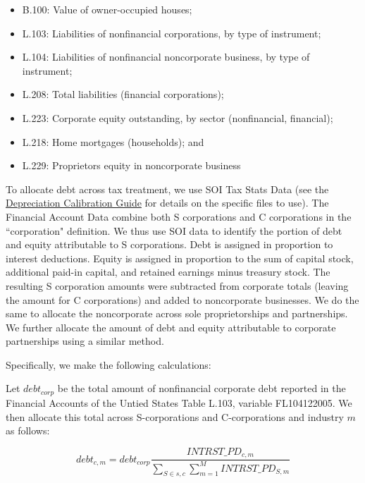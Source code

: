 \documentclass[article,11pt,letterpaper,fleqn]{article}
\theoremstyle{definition}
\numberwithin{equation}{section}
\begin{document}
\begin{itemize}
\item B.100: Value of owner-occupied houses;
\item L.103: Liabilities of nonfinancial corporations, by type of instrument;
\item L.104: Liabilities of nonfinancial noncorporate business, by type of instrument;
\item L.208: Total liabilities (financial corporations);
\item L.223: Corporate equity outstanding, by sector (nonfinancial, financial);
\item L.218: Home mortgages (households); and
\item L.229: Proprietors equity in noncorporate business
\end{itemize}

To allocate debt across tax treatment, we use SOI Tax Stats Data (see the \href{https://github.com/OpenSourcePolicyCenter/dynamic/blob/master/Data/Calibration/DepreciationParameters/Depreciation_Calibration_Guide.pdf}{Depreciation Calibration Guide} for details on the specific files to use).  The Financial Account Data combine both S corporations and C corporations in the ``corporation" definition.  We thus use SOI data to identify the portion of debt and equity attributable to S corporations. Debt is assigned in proportion to interest deductions. Equity is assigned in proportion to the sum of capital stock, additional paid-in capital, and retained earnings minus treasury stock. The resulting S corporation amounts were subtracted from corporate totals (leaving the amount for C corporations) and added to noncorporate businesses.  We do the same to allocate the noncorporate across sole proprietorships and partnerships.  We further allocate the amount of debt and equity attributable to corporate partnerships using a similar method.

Specifically, we make the following calculations:  

Let $debt_{corp}$ be the total amount of nonfinancial corporate debt reported in the Financial Accounts of the Untied States Table L.103, variable FL104122005.  We then allocate this total across S-corporations and C-corporations and industry $m$ as follows:

\begin{equation}
debt_{c,m} = debt_{corp}\frac{INTRST\_PD_{c,m}}{\sum_{S\in{s,c}}\sum_{m=1}^{M}INTRST\_PD_{S,m}}
\end{equation}
\end{document}
